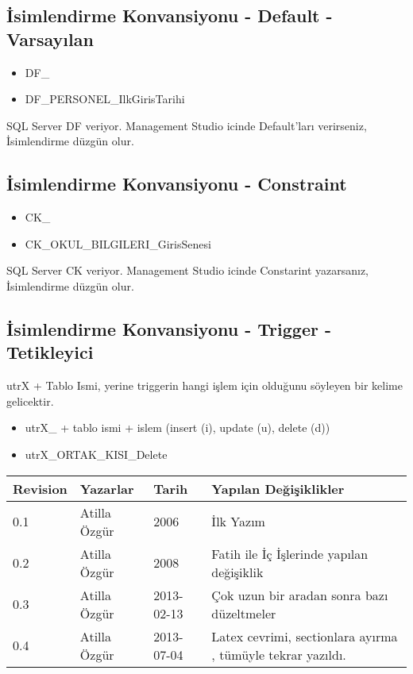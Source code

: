 \documentclass[10pt,a4paper,draft]{article}
\begin{document}
\subsection{İsimlendirme Konvansiyonu - Default - Varsayılan}  
\begin{itemize}
\item DF\_
\item DF\_PERSONEL\_IlkGirisTarihi 
\end{itemize}  
  
SQL Server DF veriyor. Management Studio icinde Default'ları verirseniz, İsimlendirme düzgün olur. 		  

\subsection{İsimlendirme Konvansiyonu - Constraint }  
\begin{itemize}
\item CK\_
\item CK\_OKUL\_BILGILERI\_GirisSenesi  
\end{itemize}  
  
SQL Server CK veriyor. Management Studio icinde Constarint yazarsanız, İsimlendirme düzgün olur. 				 
  
\subsection{İsimlendirme Konvansiyonu - Trigger - Tetikleyici  }  
utrX + Tablo Ismi, yerine triggerin hangi işlem için olduğunu söyleyen bir kelime gelicektir. 

\begin{itemize}
\item utrX\_ + tablo ismi + islem (insert (i), update (u), delete (d))
\item utrX\_ORTAK\_KISI\_Delete
\end{itemize}  

  

\begin{tabular}{|l|l|l|l|}
\hline Revision & Yazarlar & Tarih & Yapılan Değişiklikler  \\ 
\hline 0.1 &  Atilla Özgür & 2006 & İlk Yazım   \\ 
\hline 0.2 &  Atilla Özgür & 2008 & Fatih ile İç İşlerinde yapılan değişiklik \\ 
\hline 0.3 &  Atilla Özgür & 2013-02-13 & Çok uzun bir aradan sonra bazı düzeltmeler  \\ 
\hline 0.4 &  Atilla Özgür & 2013-07-04 & Latex cevrimi, sectionlara ayırma , tümüyle tekrar yazıldı.  \\ 
\hline 
\end{tabular} 
\end{document}

